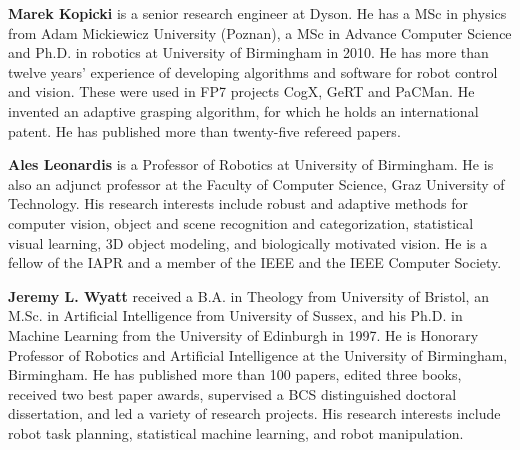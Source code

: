\documentclass{ws-ijhr}
\begin{document}
\vspace*{13pt}  
\noindent%
\parbox{5truein}{
\begin{minipage}[b]{1truein}
\centerline{{}}
\end{minipage}
\hfill %
\begin{minipage}[b]{3.85truein}
{{\bf Marek Kopicki} is a senior research engineer at Dyson. He has a MSc in physics from Adam Mickiewicz University (Poznan), a MSc in Advance Computer Science and Ph.D. in robotics at University of Birmingham in 2010. He has more than twelve years’ experience of developing algorithms and software for robot control and vision. These were used in  FP7 projects CogX, GeRT and PaCMan. He invented an adaptive grasping algorithm, for which he holds an international patent. He has published more than twenty-five refereed papers.\hfilneg}
\end{minipage}} %


\vspace*{13pt}  
\noindent%
\parbox{5truein}{
\begin{minipage}[b]{1truein}
\centerline{{}}
\end{minipage}
\hfill %
\begin{minipage}[b]{3.85truein}
{{\bf Ales Leonardis} is a Professor of Robotics at University of Birmingham. He is also an adjunct professor at the Faculty of Computer Science, Graz University of Technology. His research interests include robust and adaptive methods for computer vision, object and scene recognition and categorization, statistical visual learning, 3D object modeling, and biologically motivated vision. He is a fellow of the IAPR and a member of the IEEE and the IEEE Computer Society. \hfilneg}
\end{minipage}} %


\vspace*{13pt}  
\noindent%
\parbox{5truein}{
\begin{minipage}[b]{1truein}
\centerline{{}}
\end{minipage}
\hfill %
\begin{minipage}[b]{3.85truein}
{{\bf Jeremy L. Wyatt}
received a B.A. in Theology from University of Bristol, an M.Sc. in Artificial Intelligence from University of Sussex, and his Ph.D. in Machine Learning from the University of Edinburgh in 1997. He is Honorary Professor of Robotics and Artificial Intelligence at the University of Birmingham, Birmingham. He has published more than 100 papers, edited three books, received two best paper awards, supervised a BCS distinguished doctoral dissertation, and led a variety of research projects. His research interests include robot task planning, statistical machine learning, and robot manipulation. \hfilneg}
\end{minipage}} %


\vfill\eject
\end{document}
